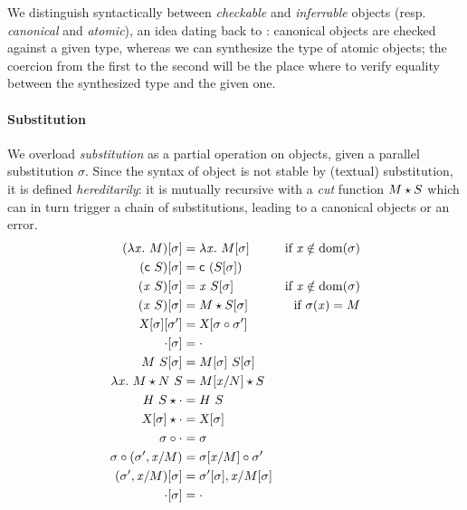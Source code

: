 \documentclass[9pt]{sigplanconf}
\begin{document}
We distinguish syntactically between \emph{checkable} and
\emph{inferrable} objects (resp. \emph{canonical} and \emph{atomic}),
an idea dating back to \cite{pierce2000local}: canonical objects are
checked against a given type, whereas we can synthesize the type of
atomic objects; the coercion from the first to the second will be the
place where to verify equality between the synthesized type and the
given one.

\paragraph{Substitution}

We overload \emph{substitution} as a partial operation on objects, given
a parallel substitution $\sigma$. Since the syntax of object is not
stable by (textual) substitution, it is defined \emph{hereditarily}: it
is mutually recursive with a \emph{cut} function ${M}\star{S}$ which can
in turn trigger a chain of substitutions, leading to a canonical objects
or an error.
\begin{align*}
  {(\lambda{\ensuremath{\text{\textit{x}}}}.\ M)}[{\sigma}] &= \lambda{\ensuremath{\text{\textit{x}}}}.\  {{M}[{\sigma}]} &
  \text{if $\text{\textit{x}}\notin \operatorname{dom}{\!(\sigma)}$}
  \\
  {({\text{\textsf{c}}}\  S)}[{\sigma}] &= {\text{\textsf{c}}}\  {({S}[{\sigma}])}
  \\
  {({\text{\textit{x}}}\  S)}[{\sigma}] &=
  {\text{\textit{x}}}\  {{S}[{\sigma}]} &
  \text{if $\text{\textit{x}}\notin \operatorname{dom}{\!(\sigma)}$}
  \\
  {({\text{\textit{x}}}\  S)}[{\sigma}] &=
  {M}\star{{S}[{\sigma}]} &
  \text{if $\sigma(\text{\textit{x}}) = M$}
  \\
  {{\text{\textsl{X}}}[{\sigma}]}[{\sigma'}] &=
  {\text{\textsl{X}}}[{{\sigma}\circ{\sigma'}}]
  \\
  {\cdot}[{\sigma}] &=
  \cdot \\
  {{M}\ {S}}[{\sigma}] &=
  {{M}[{\sigma}]}\ {{S}[{\sigma}]}
  \\
  {\lambda{\ensuremath{\text{\textit{x}}}}.\  M}\star{{N}\ {S}} &=
  {{M}[{{\text{\textit{x}}}/{N}}]}\star{S}
  \\
  {{H}\  S}\star{\cdot} &=
  {H}\  S
  \\
  {{\text{\textsl{X}}}[{\sigma}]}\star{\cdot} &= {\text{\textsl{X}}}[{\sigma}]
  \\
  {\sigma}\circ{\cdot} &=
  \sigma
  \\
  {\sigma}\circ{({\sigma'},{{\ensuremath{\text{\textit{x}}}}/{M}})} &=
  {{\sigma}[{{\text{\textit{x}}}/{M}}]}\circ{\sigma}'
  \\
  {({\sigma'},{{\text{\textit{x}}}/{M}})}[{\sigma}] &=
  {{\sigma'}[{\sigma}]},{{\text{\textit{x}}}/{{M}[{\sigma}]}}
  \\
  {\cdot}[{\sigma}] &= \cdot
\end{align*}
\end{document}

